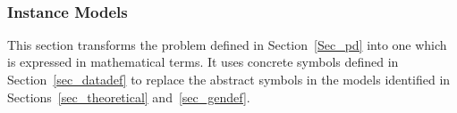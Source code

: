 \documentclass[12pt]{article}
\newcommand{\colAwidth}{0.13\textwidth}
\newcommand{\colBwidth}{0.82\textwidth}
\providecommand{\DIFdelbegin}{} %
\providecommand{\DIFdelend}{} %
\newcommand{\DIFscaledelfig}{0.5}
\newlength{\DIFdelgraphicswidth} %
\newlength{\DIFdelgraphicsheight} %
\newcommand{\DIFdelincludegraphics}[2][]{%
\sbox{\DIFdelgraphicsbox}{\DIFOincludegraphics[#1]{#2}}%
\settoboxwidth{\DIFdelgraphicswidth}{\DIFdelgraphicsbox} %
\settoboxtotalheight{\DIFdelgraphicsheight}{\DIFdelgraphicsbox} %
\scalebox{\DIFscaledelfig}{%
\parbox[b]{\DIFdelgraphicswidth}{\usebox{\DIFdelgraphicsbox}\\[-\baselineskip] \rule{\DIFdelgraphicswidth}{0em}}\llap{\resizebox{\DIFdelgraphicswidth}{\DIFdelgraphicsheight}{%
\setlength{\unitlength}{\DIFdelgraphicswidth}%
\begin{picture}(1,1)%
\thicklines\linethickness{2pt} %
{\color[rgb]{1,0,0}\put(0,0){\framebox(1,1){}}}%
{\color[rgb]{1,0,0}\put(0,0){\line( 1,1){1}}}%
{\color[rgb]{1,0,0}\put(0,1){\line(1,-1){1}}}%
\end{picture}%
}\hspace*{3pt}}} %
} %
\DeclareRobustCommand{\DIFdelbegin}{\DIFOdelbegin \let\includegraphics\DIFdelincludegraphics} %
\DeclareRobustCommand{\DIFdelend}{\DIFOaddend \let\includegraphics\DIFOincludegraphics} %
\begin{document}

~\newline

\noindent
\renewcommand*{\arraystretch}{1.5}
\DIFdelbegin %
\DIFdelend %

\subsubsection{Instance Models} \label{sec_instance}


This section transforms the problem defined in Section~\ref{Sec_pd} into
one which is expressed in mathematical terms. It uses concrete symbols defined
in Section~\ref{sec_datadef} to replace the abstract symbols in the models
identified in Sections~\ref{sec_theoretical} and~\ref{sec_gendef}.

\end{document}
